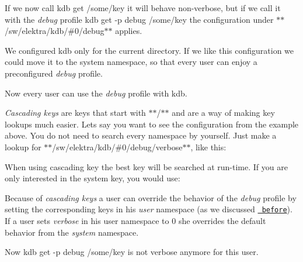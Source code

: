 If we now call {\ttfamily kdb get /some/key} it will behave non-\/verbose, but if we call it with the {\itshape debug} profile {\ttfamily kdb get -\/p debug /some/key} the configuration under $\ast$$\ast$/sw/elektra/kdb/\#0/debug$\ast$$\ast$ applies.

We configured kdb only for the current directory. If we like this configuration we could move it to the system namespace, so that every user can enjoy a preconfigured {\itshape debug} profile.


\begin{DoxyCode}{0}
\end{DoxyCode}


Now every user can use the {\itshape debug} profile with kdb.

{\itshape Cascading keys} are keys that start with $\ast$$\ast$/$\ast$$\ast$ and are a way of making key lookups much easier. Let\textquotesingle{}s say you want to see the configuration from the example above. You do not need to search every namespace by yourself. Just make a lookup for $\ast$$\ast$/sw/elektra/kdb/\#0/debug/verbose$\ast$$\ast$, like this\+:


\begin{DoxyCode}{0}
\end{DoxyCode}


When using cascading key the best key will be searched at run-\/time. If you are only interested in the system key, you would use\+:


\begin{DoxyCode}{0}
\end{DoxyCode}


Because of {\itshape cascading keys} a user can override the behavior of the {\itshape debug} profile by setting the corresponding keys in his {\itshape user} namespace (as we discussed \href{\#cascading-keys}{\texttt{ before}}). If a user sets {\itshape verbose} in his user namespace to 0 she overrides the default behavior from the {\itshape system} namespace.


\begin{DoxyCode}{0}
\end{DoxyCode}


Now {\ttfamily kdb get -\/p debug /some/key} is not verbose anymore for this user. 